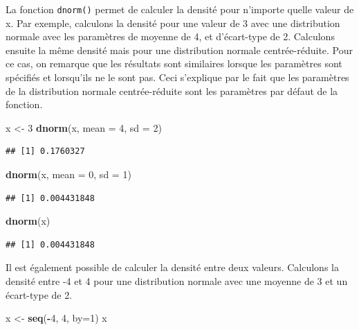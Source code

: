 \documentclass[
]{book}
\newenvironment{Shaded}{\begin{snugshade}}{\end{snugshade}}
\newcommand{\AttributeTok}[1]{\textcolor[rgb]{0.13,0.29,0.53}{#1}}
\newcommand{\DecValTok}[1]{\textcolor[rgb]{0.00,0.00,0.81}{#1}}
\newcommand{\FunctionTok}[1]{\textcolor[rgb]{0.13,0.29,0.53}{\textbf{#1}}}
\newcommand{\NormalTok}[1]{#1}
\newcommand{\OtherTok}[1]{\textcolor[rgb]{0.56,0.35,0.01}{#1}}
\newcommand{\SpecialCharTok}[1]{\textcolor[rgb]{0.81,0.36,0.00}{\textbf{#1}}}
\begin{document}
La fonction \texttt{dnorm()} permet de calculer la densité pour n'importe quelle valeur de x. Par exemple, calculons la densité pour une valeur de 3 avec une distribution normale avec les paramètres de moyenne de 4, et d'écart-type de 2. Calculons ensuite la même densité mais pour une distribution normale centrée-réduite. Pour ce cas, on remarque que les résultats sont similaires lorsque les paramètres sont spécifiés et lorsqu'ils ne le sont pas. Ceci s'explique par le fait que les paramètres de la distribution normale centrée-réduite sont les paramètres par défaut de la fonction.

\begin{Shaded}
\begin{Highlighting}[]
\NormalTok{x }\OtherTok{\textless{}{-}} \DecValTok{3}
\FunctionTok{dnorm}\NormalTok{(x, }\AttributeTok{mean =} \DecValTok{4}\NormalTok{, }\AttributeTok{sd =} \DecValTok{2}\NormalTok{)}
\end{Highlighting}
\end{Shaded}

\begin{verbatim}
## [1] 0.1760327
\end{verbatim}

\begin{Shaded}
\begin{Highlighting}[]
\FunctionTok{dnorm}\NormalTok{(x, }\AttributeTok{mean =} \DecValTok{0}\NormalTok{, }\AttributeTok{sd =} \DecValTok{1}\NormalTok{)}
\end{Highlighting}
\end{Shaded}

\begin{verbatim}
## [1] 0.004431848
\end{verbatim}

\begin{Shaded}
\begin{Highlighting}[]
\FunctionTok{dnorm}\NormalTok{(x)}
\end{Highlighting}
\end{Shaded}

\begin{verbatim}
## [1] 0.004431848
\end{verbatim}

Il est également possible de calculer la densité entre deux valeurs. Calculons la densité entre -4 et 4 pour une distribution normale avec une moyenne de 3 et un écart-type de 2.

\begin{Shaded}
\begin{Highlighting}[]
\NormalTok{x }\OtherTok{\textless{}{-}} \FunctionTok{seq}\NormalTok{(}\SpecialCharTok{{-}}\DecValTok{4}\NormalTok{, }\DecValTok{4}\NormalTok{, }\AttributeTok{by=}\DecValTok{1}\NormalTok{)}
\NormalTok{x}
\end{Highlighting}
\end{Shaded}
\end{document}
